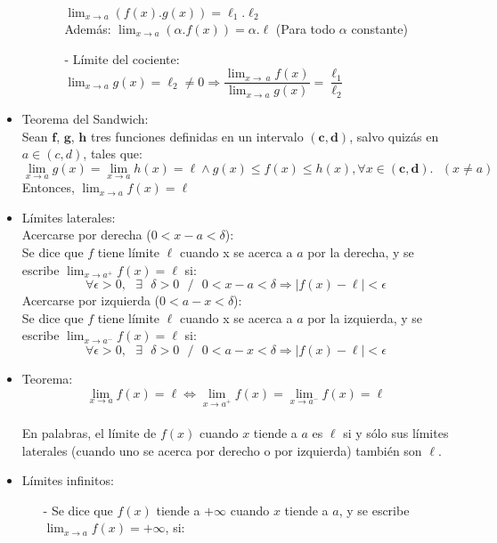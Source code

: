 \documentclass[a4paper,11pt]{report}
\begin{document}
\begin{itemize}
\begin{enumerate}
\begin{itemize}
$\displaystyle \lim_{x\to a} (f(x).g(x)) = \ell_1.\ell_2$ \\[5pt]
Además: $\displaystyle \lim_{x\to a} (\alpha\text{.}f(x)) = \alpha \text{.}\ell$ (Para todo $\alpha$ constante) \\[5pt]
\item[-] Límite del cociente: \\[5pt]
$\displaystyle \lim_{x\to a} g(x) = \ell_2 \neq 0 \Longrightarrow  \dfrac{\displaystyle \lim_{x\to\ a} f(x)}{\displaystyle \lim_{x\to a} g(x)} = \dfrac{\ell_1}{\ell_2}$
\end{itemize}
\end{enumerate}
\item Teorema del Sandwich: \\
Sean $\mathbf{f}$, $\mathbf{g}$, $\mathbf{h}$ tres funciones definidas en un intervalo $\mathbf{(c,d)}$, salvo quizás en $a \in (c,d)$, tales que:
$$\displaystyle \lim_{x\to a} g(x) = \lim_{x\to a} h(x) = \ell \wedge g(x) \leqslant f(x) \leqslant h(x), \forall x \in \mathbf{(c,d)}.\text{ } (x\neq a)$$
Entonces, $\displaystyle \lim_{x\to a} f(x) = \ell$
\item Límites laterales: \\
Acercarse por derecha ($0<x-a<\delta$): \\
Se dice que $f$ tiene límite $\ell$ cuando x se acerca a $a$ por la derecha, y se escribe $\displaystyle \lim_{x\to a^{+}}  f(x) = \ell$ si:
$$\forall \epsilon > 0,\text{ } \exists \text{ }\delta > 0\text{ } /\text{ } 0<x-a<\delta \Longrightarrow |f(x) - \ell|<\epsilon$$
Acercarse por izquierda ($0<a-x<\delta$): \\
Se dice que $f$ tiene límite $\ell$ cuando x se acerca a $a$ por la izquierda, y se escribe $\displaystyle \lim_{x\to a^{-}}  f(x) = \ell$ si:
$$\forall \epsilon > 0,\text{ } \exists \text{ }\delta > 0\text{ } /\text{ } 0<a-x<\delta \Longrightarrow |f(x) - \ell|<\epsilon$$
\item Teorema: \\
 $$\displaystyle \lim_{x\to a} f(x) = \ell \Longleftrightarrow \lim_{x\to a^{+}} f(x) = \lim_{x\to a^{-}} f(x) = \ell$$ \\
En palabras, el límite de $f(x)$ cuando $x$ tiende a $a$ es $\ell$ si y sólo sus límites laterales (cuando uno se acerca por derecho o por izquierda) también son $\ell$.
\item Límites infinitos: \\
\begin{itemize}
\item[-] Se dice que $f(x)$ tiende a $+\infty$ cuando $x$ tiende a $a$, y se escribe $\displaystyle \lim_{x\to a} f(x) = +\infty$, si: 

\end{itemize}
\end{itemize}
\end{document}
